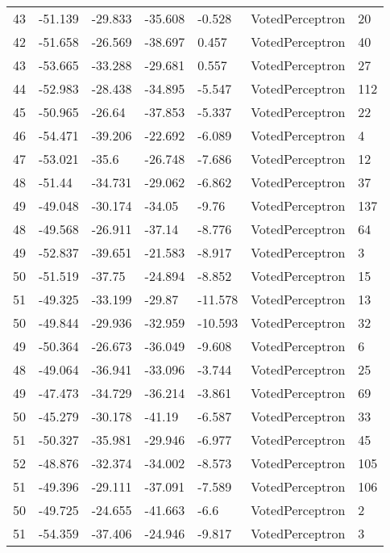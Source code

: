 \begin{tabular}{lllllll}
43 & -51.139 & -29.833 & -35.608 &  -0.528 &    VotedPerceptron &   20 \\
42 & -51.658 & -26.569 & -38.697 &   0.457 &    VotedPerceptron &   40 \\
43 & -53.665 & -33.288 & -29.681 &   0.557 &    VotedPerceptron &   27 \\
44 & -52.983 & -28.438 & -34.895 &  -5.547 &    VotedPerceptron &  112 \\
45 & -50.965 &  -26.64 & -37.853 &  -5.337 &    VotedPerceptron &   22 \\
46 & -54.471 & -39.206 & -22.692 &  -6.089 &    VotedPerceptron &    4 \\
47 & -53.021 &   -35.6 & -26.748 &  -7.686 &    VotedPerceptron &   12 \\
48 &  -51.44 & -34.731 & -29.062 &  -6.862 &    VotedPerceptron &   37 \\
49 & -49.048 & -30.174 &  -34.05 &   -9.76 &    VotedPerceptron &  137 \\
48 & -49.568 & -26.911 &  -37.14 &  -8.776 &    VotedPerceptron &   64 \\
49 & -52.837 & -39.651 & -21.583 &  -8.917 &    VotedPerceptron &    3 \\
50 & -51.519 &  -37.75 & -24.894 &  -8.852 &    VotedPerceptron &   15 \\
51 & -49.325 & -33.199 &  -29.87 & -11.578 &    VotedPerceptron &   13 \\
50 & -49.844 & -29.936 & -32.959 & -10.593 &    VotedPerceptron &   32 \\
49 & -50.364 & -26.673 & -36.049 &  -9.608 &    VotedPerceptron &    6 \\
48 & -49.064 & -36.941 & -33.096 &  -3.744 &    VotedPerceptron &   25 \\
49 & -47.473 & -34.729 & -36.214 &  -3.861 &    VotedPerceptron &   69 \\
50 & -45.279 & -30.178 &  -41.19 &  -6.587 &    VotedPerceptron &   33 \\
51 & -50.327 & -35.981 & -29.946 &  -6.977 &    VotedPerceptron &   45 \\
52 & -48.876 & -32.374 & -34.002 &  -8.573 &    VotedPerceptron &  105 \\
51 & -49.396 & -29.111 & -37.091 &  -7.589 &    VotedPerceptron &  106 \\
50 & -49.725 & -24.655 & -41.663 &    -6.6 &    VotedPerceptron &    2 \\
51 & -54.359 & -37.406 & -24.946 &  -9.817 &    VotedPerceptron &    3 \\

\end{tabular}

